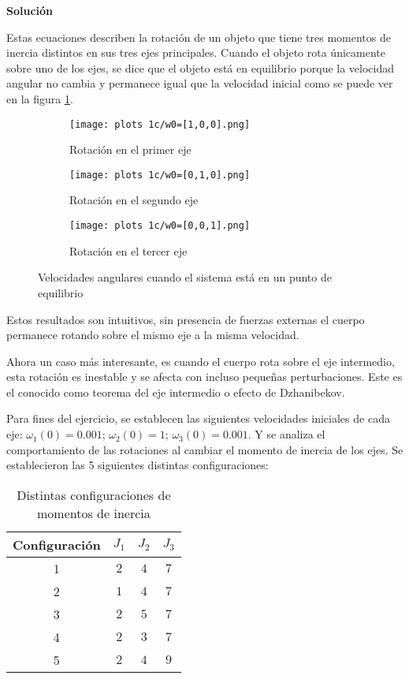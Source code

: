 \documentclass[letterpaper, 12pt]{article}
\begin{document}
\begin{enumerate}
\begin{enumerate}
\textbf{Solución}

Estas ecuaciones describen la rotación de un objeto que tiene tres momentos de inercia distintos en sus tres ejes principales.
Cuando el objeto rota únicamente sobre uno de los ejes, se dice que el objeto está en equilibrio porque la velocidad angular no cambia y permanece igual que la velocidad inicial como se puede ver en la figura \ref{fig:sistema en punto de equilibrio}.

\begin{figure}[h!]
    \centering
    \hspace{1cm}
    \begin{subfigure}[h]{0.28\linewidth}
        \texttt{[image: plots 1c/w0=[1,0,0].png]}
        \caption{\centering Rotación en el primer eje}
    \end{subfigure}
    \begin{subfigure}[h]{0.28\linewidth}
        \texttt{[image: plots 1c/w0=[0,1,0].png]}
        \caption{\centering Rotación en el segundo eje}
    \end{subfigure}
    \begin{subfigure}[h]{0.28\linewidth}
        \texttt{[image: plots 1c/w0=[0,0,1].png]}
        \caption{\centering Rotación en el tercer eje}
    \end{subfigure}
    \caption{Velocidades angulares cuando el sistema está en un punto de equilibrio}
    \label{fig:sistema en punto de equilibrio}
\end{figure}

Estos resultados son intuitivos, sin presencia de fuerzas externas el cuerpo permanece rotando sobre el mismo eje a la misma velocidad.

Ahora un caso más interesante, es cuando el cuerpo rota sobre el eje intermedio, esta rotación es inestable y  se afecta con incluso pequeñas perturbaciones. Este es el conocido como teorema del eje intermedio o efecto de Dzhanibekov.

Para fines del ejercicio, se establecen las siguientes velocidades iniciales de cada eje:
$\omega_1(0) = 0.001$; $\omega_2(0) = 1$; $\omega_3(0) = 0.001$.
Y se analiza el comportamiento de las rotaciones al cambiar el momento de inercia de los ejes.
Se establecieron las 5 siguientes distintas configuraciones:

\begin{table}[H]
\centering
\begin{tabular}{|c|c|c|c|}
    \hline
    Configuración & $J_1$ & $J_2$ & $J_3$ \\
    \hline
    1   & $2$   & $4$   & $7$   \\
    2   & $1$   & $4$   & $7$   \\
    3   & $2$   & $5$   & $7$   \\
    4   & $2$   & $3$   & $7$   \\
    5   & $2$   & $4$   & $9$   \\
    \hline
\end{tabular}
\caption{Distintas configuraciones de momentos de inercia}
\label{tab:configuraciones de momentos de inercia}
\end{table}


\end{enumerate}
\end{enumerate}
\end{document}
